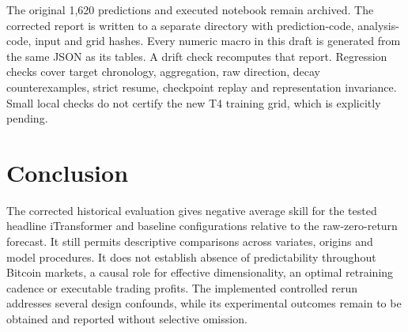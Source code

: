 \documentclass[onecolumn,journal,a4paper,11pt]{IEEEtran}
\begin{document}
The original 1,620 predictions and executed notebook remain archived. The
corrected report is written to a separate directory with prediction-code,
analysis-code, input and grid hashes. Every numeric macro in this draft is
generated from the same JSON as its tables. A drift check recomputes that
report. Regression checks cover target chronology, aggregation, raw direction,
decay counterexamples, strict resume, checkpoint replay and representation
invariance. Small local checks do not certify the new T4 training grid,
which is explicitly pending.

\section{Conclusion}
The corrected historical evaluation gives negative average skill for the
tested headline iTransformer and baseline configurations relative to the
raw-zero-return forecast. It still permits descriptive comparisons across
variates, origins and model procedures. It does not establish absence of
predictability throughout Bitcoin markets, a causal role for effective
dimensionality, an optimal retraining cadence or executable trading profits.
The implemented controlled rerun addresses several design confounds, while
its experimental outcomes remain to be obtained and reported without
selective omission.



\end{document}
